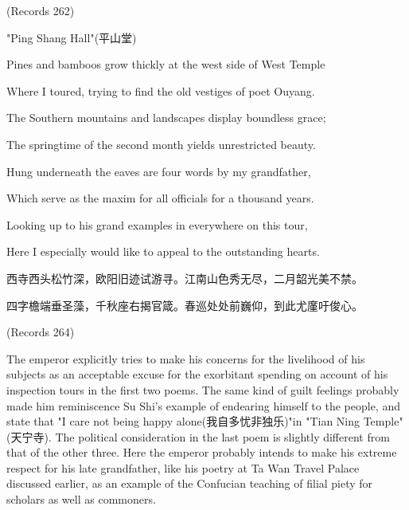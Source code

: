 (Records 262)

"Ping Shang Hall"(平山堂)

Pines and bamboos grow thickly at the west side of West Temple

Where I toured, trying to find the old vestiges of poet Ouyang.

The Southern mountains and landscapes display boundless grace;

The springtime of the second month yields unrestricted beauty.

Hung underneath the eaves are four words by my grandfather,

Which serve as the maxim for all officials for a thousand years.

Looking up to his grand examples in everywhere on this tour,


\begin{BookQuote}
Here I especially would like to appeal to the outstanding hearts.
\end{BookQuote}

\begin{BookQuote}
西寺西头松竹深，欧阳旧迹试游寻。江南山色秀无尽，二月韶光美不禁。
\end{BookQuote}

\begin{BookQuote}
四字檐端垂圣藻，千秋座右揭官箴。春巡处处前巍仰，到此尤廑吁俊心。
\end{BookQuote}

(Records 264)

The emperor explicitly tries to make his concerns for the livelihood of his subjects as an acceptable excuse for the exorbitant spending on account of his inspection tours in the first two poems. The same kind of guilt feelings probably made him reminiscence Su Shi's example of endearing himself to the people, and state that "I care not being happy alone(我自多忧非独乐)"in "Tian Ning Temple"(天宁寺). The political consideration in the last poem is slightly different from that of the other three. Here the emperor probably intends to make his extreme respect for his late grandfather, like his poetry at Ta Wan Travel Palace discussed earlier, as an example of the Confucian teaching of filial piety for scholars as well as commoners.

